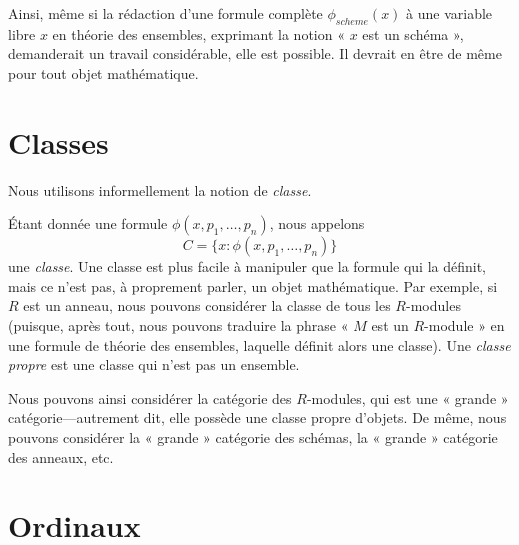 \medskip\noindent
Ainsi, même si la rédaction d'une formule complète $\phi_{scheme}(x)$ à une
variable libre $x$ en théorie des ensembles, exprimant la notion « $x$ est un
schéma », demanderait un travail considérable, elle est possible. Il devrait en
être de même pour tout objet mathématique.

\section{Classes}
\label{section-classes}

\noindent
Nous utilisons informellement la notion de {\it classe}.\par\noindent
Étant donnée une formule $\phi(x, p_1, \ldots, p_n)$, nous appelons
$$
C = \{x : \phi(x, p_1, \ldots, p_n)\}
$$
une {\it classe}. Une classe est plus facile à manipuler que la formule qui la
définit, mais ce n'est pas, à proprement parler, un objet mathématique. Par
exemple, si $R$ est un anneau, nous pouvons considérer la classe de tous les
$R$-modules (puisque, après tout, nous pouvons traduire la phrase « $M$ est un
$R$-module » en une formule de théorie des ensembles, laquelle définit alors
une classe). Une {\it classe propre} est une classe qui n'est pas un ensemble.

\medskip\noindent
Nous pouvons ainsi considérer la catégorie des $R$-modules, qui est une
« grande » catégorie---autrement dit, elle possède une classe propre d'objets.
De même, nous pouvons considérer la « grande » catégorie des schémas, la
« grande » catégorie des anneaux, etc.



\section{Ordinaux}
\label{section-ordinals}

